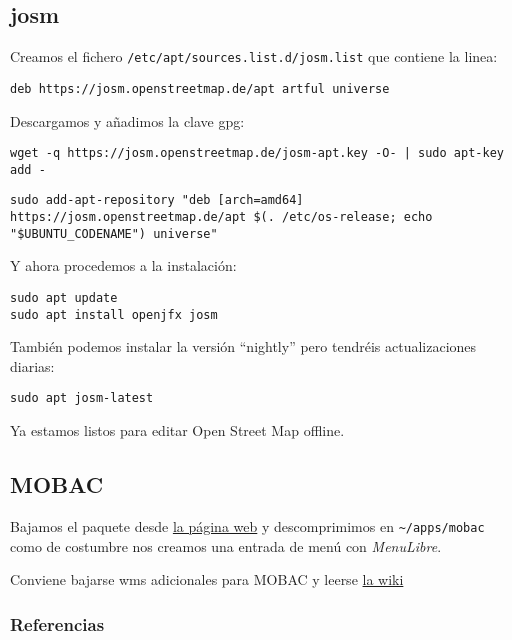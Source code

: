\documentclass[
  12pt,
  spanish,
]{article}
\begin{document}
\hypertarget{josm}{%
\subsection{josm}\label{josm}}

Creamos el fichero \texttt{/etc/apt/sources.list.d/josm.list} que
contiene la linea:

\begin{verbatim}
deb https://josm.openstreetmap.de/apt artful universe
\end{verbatim}

Descargamos y añadimos la clave gpg:

\begin{verbatim}
wget -q https://josm.openstreetmap.de/josm-apt.key -O- | sudo apt-key add -
\end{verbatim}

\begin{verbatim}
sudo add-apt-repository "deb [arch=amd64] https://josm.openstreetmap.de/apt $(. /etc/os-release; echo "$UBUNTU_CODENAME") universe"
\end{verbatim}

Y ahora procedemos a la instalación:

\begin{verbatim}
sudo apt update
sudo apt install openjfx josm 
\end{verbatim}

También podemos instalar la versión ``nightly'' pero tendréis
actualizaciones diarias:

\begin{verbatim}
sudo apt josm-latest
\end{verbatim}

Ya estamos listos para editar Open Street Map offline.

\hypertarget{mobac}{%
\subsection{MOBAC}\label{mobac}}

Bajamos el paquete desde \href{http://mobac.sourceforge.net/}{la página
web} y descomprimimos en \texttt{\textasciitilde{}/apps/mobac} como de
costumbre nos creamos una entrada de menú con \emph{MenuLibre}.

Conviene bajarse wms adicionales para MOBAC y leerse
\href{http://mobac.sourceforge.net/wiki/index.php/Custom_XML_Map_Sources}{la
wiki}

\hypertarget{referencias-1}{%
\subsubsection{Referencias}\label{referencias-1}}
\end{document}
